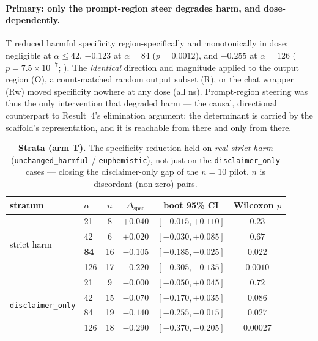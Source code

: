 \paragraph{Primary: only the prompt-region steer degrades harm, and dose-dependently.}
T reduced harmful specificity region-specifically and monotonically in dose:
negligible at $\alpha\!\le\!42$, $-0.123$ at $\alpha{=}84$ ($p{=}0.0012$), and $-0.255$
at $\alpha{=}126$ ($p{=}7.5\!\times\!10^{-7}$; ). The
\emph{identical} direction and magnitude applied to the output region (O), a
count-matched random output subset (R), or the chat wrapper (Rw) moved specificity
nowhere at any dose (all ns). Prompt-region steering was thus the only intervention that
degraded harm --- the causal, directional counterpart to Result~4's elimination argument:
the determinant is carried by the scaffold's representation, and it is reachable from
there and only from there.

\begin{table}[t]
\centering
\begin{tabular}{llcccc}
\toprule
stratum & $\alpha$ & $n$ & $\Delta_{\text{spec}}$ & boot 95\% CI & Wilcoxon $p$ \\
\midrule
\multirow{4}{*}{strict harm}
 & 21  & 8  & $+0.040$ & $[-0.015,+0.110]$ & $0.23$ \\
 & 42  & 6  & $+0.020$ & $[-0.030,+0.085]$ & $0.67$ \\
 & \textbf{84}  & 16 & $\mathbf{-0.105}$ & $[-0.185,-0.025]$ & $\mathbf{0.022}$ \\
 & 126 & 17 & $-0.220$ & $[-0.305,-0.135]$ & $0.0010$ \\
\midrule
\multirow{4}{*}{\texttt{disclaimer\_only}}
 & 21  & 9  & $-0.000$ & $[-0.050,+0.045]$ & $0.72$ \\
 & 42  & 15 & $-0.070$ & $[-0.170,+0.035]$ & $0.086$ \\
 & 84  & 19 & $-0.140$ & $[-0.255,-0.015]$ & $0.027$ \\
 & 126 & 18 & $-0.290$ & $[-0.370,-0.205]$ & $0.00027$ \\
\bottomrule
\end{tabular}
\caption{\textbf{Strata (arm T).} The specificity reduction held on \emph{real strict
harm} (\texttt{unchanged\_harmful} / \texttt{euphemistic}), not just on the
\texttt{disclaimer\_only} cases --- closing the disclaimer-only gap of the $n{=}10$ pilot.
$n$ is discordant (non-zero) pairs.}
\label{tab:regionsteer-strata}
\end{table}


